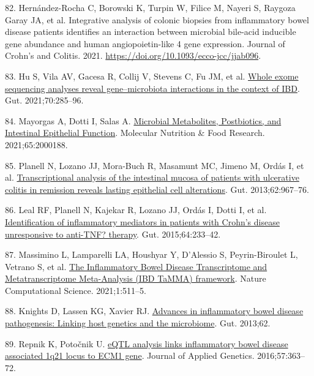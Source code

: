\documentclass[
  12pt,
  a4paper,
  twoside,
  openright]{book}
\newlength{\cslhangindent}
\newlength{\cslentryspacingunit} %
\newenvironment{CSLReferences}[2] %
 {%
  \setlength{\parindent}{0pt}
  \ifodd #1
  \let\oldpar\par
  \def\par{\hangindent=\cslhangindent\oldpar}
  \fi
  \setlength{\parskip}{#2\cslentryspacingunit}
 }%
 {}
\begin{document}
\begin{CSLReferences}{0}{0}
\leavevmode{}%
82. Hernández-Rocha C, Borowski K, Turpin W, Filice M, Nayeri S, Raygoza Garay JA, et al. Integrative analysis of colonic biopsies from inflammatory bowel disease patients identifies an interaction between microbial bile-acid inducible gene abundance and human angiopoietin-like 4 gene expression. Journal of Crohn's and Colitis. 2021. \url{https://doi.org/10.1093/ecco-jcc/jjab096}.

\leavevmode{}%
83. Hu S, Vila AV, Gacesa R, Collij V, Stevens C, Fu JM, et al. \href{https://doi.org/10.1136/gutjnl-2019-319706}{Whole exome sequencing analyses reveal gene--microbiota interactions in the context of IBD}. Gut. 2021;70:285--96.

\leavevmode{}%
84. Mayorgas A, Dotti I, Salas A. \href{https://doi.org/10.1002/mnfr.202000188}{Microbial Metabolites, Postbiotics, and Intestinal Epithelial Function}. Molecular Nutrition \& Food Research. 2021;65:2000188.

\leavevmode{}%
85. Planell N, Lozano JJ, Mora-Buch R, Masamunt MC, Jimeno M, Ordás I, et al. \href{https://doi.org/10.1136/gutjnl-2012-303333}{Transcriptional analysis of the intestinal mucosa of patients with ulcerative colitis in remission reveals lasting epithelial cell alterations}. Gut. 2013;62:967--76.

\leavevmode{}%
86. Leal RF, Planell N, Kajekar R, Lozano JJ, Ordás I, Dotti I, et al. \href{https://doi.org/10.1136/gutjnl-2013-306518}{Identification of inflammatory mediators in patients with Crohn's disease unresponsive to anti-TNF? therapy}. Gut. 2015;64:233--42.

\leavevmode{}%
87. Massimino L, Lamparelli LA, Houshyar Y, D'Alessio S, Peyrin-Biroulet L, Vetrano S, et al. \href{https://doi.org/10.1038/s43588-021-00114-y}{The Inflammatory Bowel Disease Transcriptome and Metatranscriptome Meta-Analysis (IBD TaMMA) framework}. Nature Computational Science. 2021;1:511--5.

\leavevmode{}%
88. Knights D, Lassen KG, Xavier RJ. \href{https://doi.org/10.1136/gutjnl-2012-303954}{Advances in inflammatory bowel disease pathogenesis: Linking host genetics and the microbiome}. Gut. 2013;62.

\leavevmode{}%
89. Repnik K, Potočnik U. \href{https://doi.org/10.1007/s13353-015-0334-1}{eQTL analysis links inflammatory bowel disease associated 1q21 locus to ECM1 gene}. Journal of Applied Genetics. 2016;57:363--72.


\end{CSLReferences}
\end{document}
